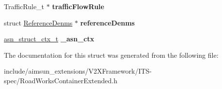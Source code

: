 \begin{DoxyCompactItemize}
\item 
Traffic\+Rule\+\_\+t $\ast$ {\bfseries traffic\+Flow\+Rule}\hypertarget{structRoadWorksContainerExtended_a9e7407c4df372a3a368272e8b4714119}{}\label{structRoadWorksContainerExtended_a9e7407c4df372a3a368272e8b4714119}

\item 
struct \hyperlink{structReferenceDenms}{Reference\+Denms} $\ast$ {\bfseries reference\+Denms}\hypertarget{structRoadWorksContainerExtended_ae41d69708e3c21b96c717a76dfa4bd13}{}\label{structRoadWorksContainerExtended_ae41d69708e3c21b96c717a76dfa4bd13}

\item 
\hyperlink{structasn__struct__ctx__s}{asn\+\_\+struct\+\_\+ctx\+\_\+t} {\bfseries \+\_\+asn\+\_\+ctx}\hypertarget{structRoadWorksContainerExtended_a3db164910c3e31a6b5a4977909e9d80c}{}\label{structRoadWorksContainerExtended_a3db164910c3e31a6b5a4977909e9d80c}

\end{DoxyCompactItemize}


The documentation for this struct was generated from the following file\+:\begin{DoxyCompactItemize}
\item 
include/aimsun\+\_\+extensions/\+V2\+X\+Framework/\+I\+T\+S-\/spec/Road\+Works\+Container\+Extended.\+h\end{DoxyCompactItemize}

